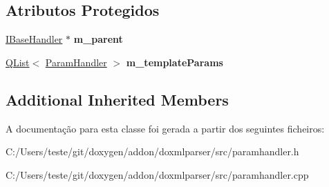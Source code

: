 \subsection*{Atributos Protegidos}
\begin{DoxyCompactItemize}
\item 
\hypertarget{class_template_param_list_handler_aa0a1ac08246d69ae9f7569f843516fcf}{\hyperlink{class_i_base_handler}{I\-Base\-Handler} $\ast$ {\bfseries m\-\_\-parent}}\label{class_template_param_list_handler_aa0a1ac08246d69ae9f7569f843516fcf}

\item 
\hypertarget{class_template_param_list_handler_a8f5583b9433d75ab42d42d7ab9b41583}{\hyperlink{class_q_list}{Q\-List}$<$ \hyperlink{class_param_handler}{Param\-Handler} $>$ {\bfseries m\-\_\-template\-Params}}\label{class_template_param_list_handler_a8f5583b9433d75ab42d42d7ab9b41583}

\end{DoxyCompactItemize}
\subsection*{Additional Inherited Members}


A documentação para esta classe foi gerada a partir dos seguintes ficheiros\-:\begin{DoxyCompactItemize}
\item 
C\-:/\-Users/teste/git/doxygen/addon/doxmlparser/src/paramhandler.\-h\item 
C\-:/\-Users/teste/git/doxygen/addon/doxmlparser/src/paramhandler.\-cpp\end{DoxyCompactItemize}
